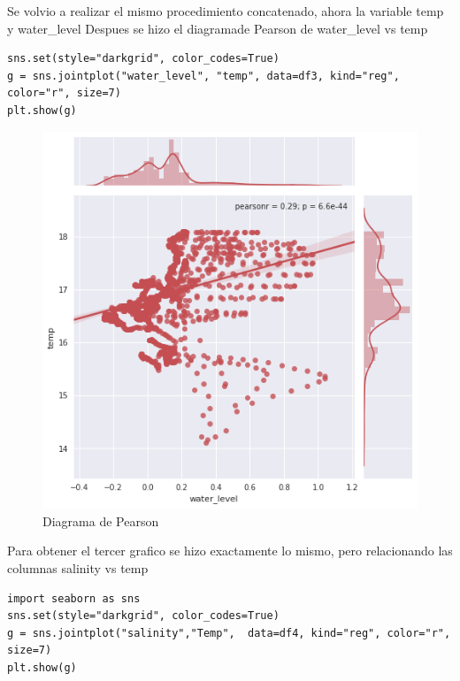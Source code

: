 \documentclass{article}
\begin{document}
Se volvio a realizar el mismo procedimiento concatenado, ahora la variable temp y water\_level
Despues se hizo el  diagramade Pearson de water\_level vs temp
\begin{verbatim}
sns.set(style="darkgrid", color_codes=True)
g = sns.jointplot("water_level", "temp", data=df3, kind="reg", color="r", size=7)
plt.show(g)
\end{verbatim}

\begin{figure}[h]
\centering
\includegraphics[scale=0.5]{pearson2.png}
\caption{Diagrama de Pearson}
\end{figure}

Para obtener el tercer grafico se hizo exactamente lo mismo, pero relacionando las columnas salinity vs temp
\begin{verbatim}
import seaborn as sns
sns.set(style="darkgrid", color_codes=True)
g = sns.jointplot("salinity","Temp",  data=df4, kind="reg", color="r", size=7)
plt.show(g)
\end{verbatim}
\end{document}
